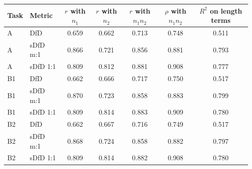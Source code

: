 \begin{tabular}{llccccc}
\toprule
Task & Metric & $r$ with $n_1$ & $r$ with $n_2$ & $r$ with $n_1 n_2$ & $\rho$ with $n_1 n_2$ & $R^2$ on length terms \\
\midrule
A & DfD & 0.659 & 0.662 & 0.713 & 0.748 & 0.511 \\
A & sDfD m:1 & 0.866 & 0.721 & 0.856 & 0.881 & 0.793 \\
A & sDfD 1:1 & 0.809 & 0.812 & 0.881 & 0.908 & 0.777 \\
B1 & DfD & 0.662 & 0.666 & 0.717 & 0.750 & 0.517 \\
B1 & sDfD m:1 & 0.870 & 0.723 & 0.858 & 0.883 & 0.799 \\
B1 & sDfD 1:1 & 0.809 & 0.814 & 0.883 & 0.909 & 0.780 \\
B2 & DfD & 0.662 & 0.667 & 0.716 & 0.749 & 0.517 \\
B2 & sDfD m:1 & 0.868 & 0.724 & 0.858 & 0.882 & 0.797 \\
B2 & sDfD 1:1 & 0.809 & 0.814 & 0.882 & 0.908 & 0.780 \\
\bottomrule
\end{tabular}